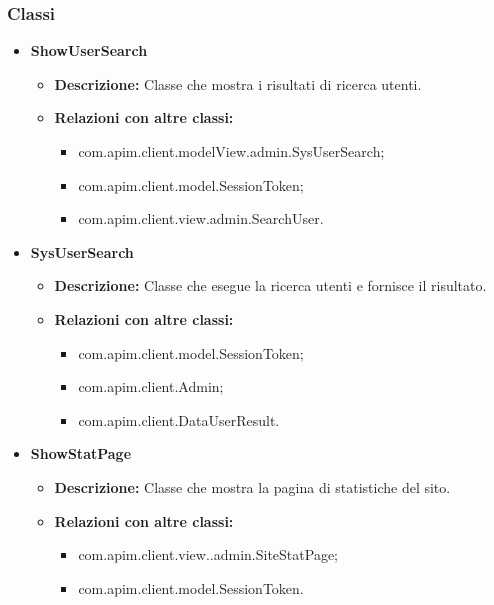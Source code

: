 {{		\subsubsection{Classi}{
			\begin{itemize}
				\item \textbf{ShowUserSearch}
					\begin{itemize}
						\item \textbf{Descrizione:} Classe che mostra i risultati di ricerca utenti.
						\item \textbf{Relazioni con altre classi:}
						\begin{itemize}
							\item com.apim.client.modelView.admin.SysUserSearch;
							\item com.apim.client.model.SessionToken;
							\item com.apim.client.view.admin.SearchUser.
						\end{itemize}
					\end{itemize}
				\item \textbf{SysUserSearch}
					\begin{itemize}
						\item \textbf{Descrizione:} Classe che esegue la ricerca utenti e fornisce il risultato.
						\item \textbf{Relazioni con altre classi:}
						\begin{itemize}
							\item com.apim.client.model.SessionToken;
							\item com.apim.client.Admin;
							\item com.apim.client.DataUserResult.
						\end{itemize}
					\end{itemize}
				\item \textbf{ShowStatPage}
					\begin{itemize}
						\item \textbf{Descrizione:} Classe che mostra la pagina di statistiche del sito.
						\item \textbf{Relazioni con altre classi:}
						\begin{itemize}
							\item com.apim.client.view..admin.SiteStatPage;
							\item com.apim.client.model.SessionToken.
						\end{itemize}
					\end{itemize}
			\end{itemize}
		}
	}
}